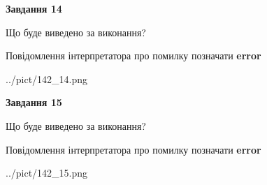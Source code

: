 \documentclass[11pt, ukrainian]{article}
\begin{document}
{\begin {large}
{\begin {center}\textbf{Завдання 14}\end {center}}\par
Що буде виведено за виконання? \par
Повідомлення інтерпретатора про помилку позначати \textbf{error}

\begin{center}
	{../pict/142_14.png}
\end{center}
\newpage

{\begin {center}\textbf{Завдання 15}\end {center}}\par
Що буде виведено за виконання? \par
Повідомлення інтерпретатора про помилку позначати \textbf{error}

\begin{center}
	{../pict/142_15.png}
\end{center}
\newpage

\end {large}}
\end{document}
